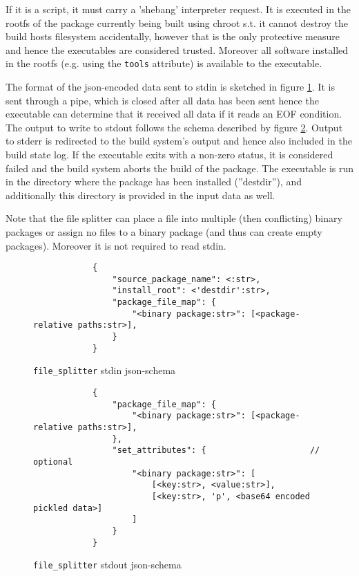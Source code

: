\documentclass[a4paper]{scrartcl}
\begin{document}
	If it is a script, it must carry a 'shebang' interpreter request. It is executed in the rootfs of the package currently being built using chroot s.t. it cannot destroy the build hosts filesystem accidentally, however that is the only protective measure and hence the executables are considered trusted. Moreover all software installed in the rootfs (e.g. using the \texttt{tools} attribute) is available to the executable.
	
	The format of the json-encoded data sent to stdin is sketched in figure \ref{fig:file_splitter_stdin_schema}. It is sent through a pipe, which is closed after all data has been sent hence the executable can determine that it received all data if it reads an EOF condition. The output to write to stdout follows the schema described by figure \ref{fig:file_splitter_stdout_schema}. Output to stderr is redirected to the build system's output and hence also included in the build state log. If the executable exits with a non-zero status, it is considered failed and the build system aborts the build of the package. The executable is run in the directory where the package has been installed (''destdir''), and additionally this directory is provided in the input data as well.
	
	Note that the file splitter can place a file into multiple (then conflicting) binary packages or assign no files to a binary package (and thus can create empty packages). Moreover it is not required to read stdin.
	
	\begin{figure}[htp]
		\centering
		
		\begin{minipage}{0.8\textwidth}
			\begin{lstlisting}
			{
				"source_package_name": <:str>,
				"install_root": <'destdir':str>,
				"package_file_map": {
					"<binary package:str>": [<package-relative paths:str>],
				}
			}
			\end{lstlisting}
		\end{minipage}
		
		\caption{\texttt{file\_splitter} stdin json-schema}
		\label{fig:file_splitter_stdin_schema}
	\end{figure}

	\begin{figure}[htp]
		\centering
		
		\begin{minipage}{0.8\textwidth}
			\begin{lstlisting}
			{
				"package_file_map": {
					"<binary package:str>": [<package-relative paths:str>],
				},
				"set_attributes": {						// optional
					"<binary package:str>": [
						[<key:str>, <value:str>],
						[<key:str>, 'p', <base64 encoded pickled data>]
					]
				}
			}
			\end{lstlisting}
		\end{minipage}
		
		\caption{\texttt{file\_splitter} stdout json-schema}
		\label{fig:file_splitter_stdout_schema}
	\end{figure}
\end{document}
